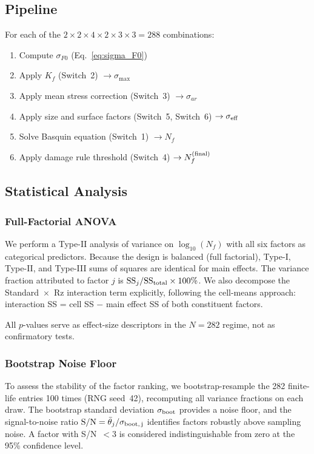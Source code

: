 \documentclass[12pt,a4paper]{article}
\begin{document}
\subsection{Pipeline}

For each of the $2\times2\times4\times2\times3\times3 = 288$ combinations:
\begin{enumerate}
  \item Compute $\sigma_{F0}$ (Eq.~\ref{eq:sigma_F0})
  \item Apply $K_f$ (Switch~2) $\rightarrow \sigma_{\max}$
  \item Apply mean stress correction (Switch~3) $\rightarrow \sigma_{ar}$
  \item Apply size and surface factors (Switch~5, Switch~6)
        $\rightarrow \sigma_{\rm eff}$
  \item Solve Basquin equation (Switch~1) $\rightarrow N_f$
  \item Apply damage rule threshold (Switch~4) $\rightarrow N_f^{\rm (final)}$
\end{enumerate}

\subsection{Statistical Analysis}

\subsubsection{Full-Factorial ANOVA}

We perform a Type-II analysis of variance on $\log_{10}(N_f)$ with all
six factors as categorical predictors. Because the design is balanced
(full factorial), Type-I, Type-II, and Type-III sums of squares are
identical for main effects. The variance fraction attributed to factor
$j$ is $\mathrm{SS}_j / \mathrm{SS}_{\rm total} \times 100\%$. We also
decompose the Standard~$\times$~Rz interaction term explicitly, following
the cell-means approach: interaction SS = cell SS $-$ main effect SS of
both constituent factors.

All $p$-values serve as effect-size descriptors in the $N=282$ regime,
not as confirmatory tests.

\subsubsection{Bootstrap Noise Floor}

To assess the stability of the factor ranking, we bootstrap-resample the
282 finite-life entries 100 times (RNG seed~42), recomputing all variance
fractions on each draw. The bootstrap standard deviation $\sigma_{\rm boot}$
provides a noise floor, and the signal-to-noise ratio
$\mathrm{S/N} = \bar{\theta}_j / \sigma_{\rm boot,\,j}$ identifies
factors robustly above sampling noise. A factor with S/N~$<3$ is
considered indistinguishable from zero at the 95\% confidence level.
\end{document}
